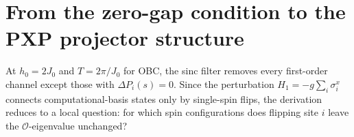 \documentclass[aps,prb,reprint,twocolumn,amsmath,amssymb,citeautoscript]{revtex4-2}
\begin{document}

\section{From the zero-gap condition to the PXP projector structure}
\label{app:PXP}

At $h_0=2J_0$ and $T=2\pi/J_0$ for OBC, the sinc filter removes every
first-order channel except those with $\Delta P_i(s)=0$. Since the
perturbation $H_1=-g\sum_i \sigma_i^x$ connects computational-basis
states only by single-spin flips, the derivation reduces to a local
question: for which spin configurations does flipping site $i$ leave the
$\mathcal O$-eigenvalue unchanged?
\end{document}
